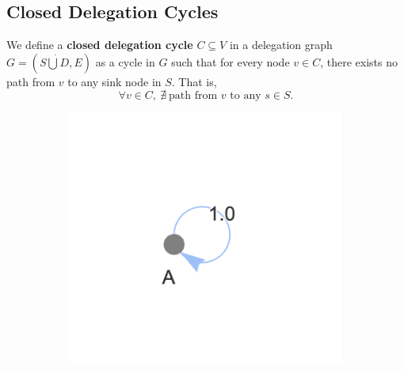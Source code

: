 

\subsection{Closed Delegation Cycles}

We define a \textbf{closed delegation cycle} $C \subseteq V$ in a delegation graph $G = (S \dot\bigcup D, E)$ as a cycle in $G$ such that for every node $v \in C$, there exists no path from $v$ to any sink node in $S$. That is,
\[
\forall v \in C,\ \nexists\ \text{path from } v \text{ to any } s \in S.
\]

\begin{figure}[h]
    \centering
    \begin{subfigure}[t]{0.32\textwidth}
        \centering
        \includegraphics[width=\textwidth]{invalid_graph_1}
    \end{subfigure}
    \hfill
    \begin{subfigure}[t]{0.32\textwidth}
        \centering

\end{subfigure}
\end{figure}
